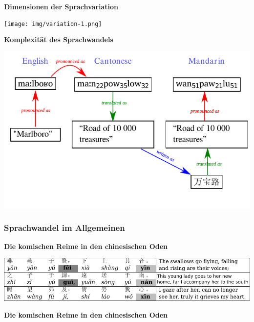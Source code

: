 \vspace{0.5cm}\par\noindent\textbf{Dimensionen der Sprachvariation}\vspace{0.5cm}

\texttt{[image: img/variation-1.png]}

\vspace{0.5cm}\par\noindent\textbf{Komplexität des Sprachwandels}\vspace{0.5cm}

\includegraphics[width=\textwidth]{img/marlboro.pdf}

\subsubsection{\texorpdfstring{{Sprachwandel im
Allgemeinen}}{Sprachwandel im Allgemeinen}}

\vspace{0.5cm}\par\noindent\textbf{Die komischen Reime in den chinesischen Oden}\vspace{0.5cm}

\includegraphics[width=\textwidth]{img/odes.pdf}


\vspace{0.5cm}\par\noindent\textbf{Die komischen Reime in den chinesischen Oden}\vspace{0.5cm}

